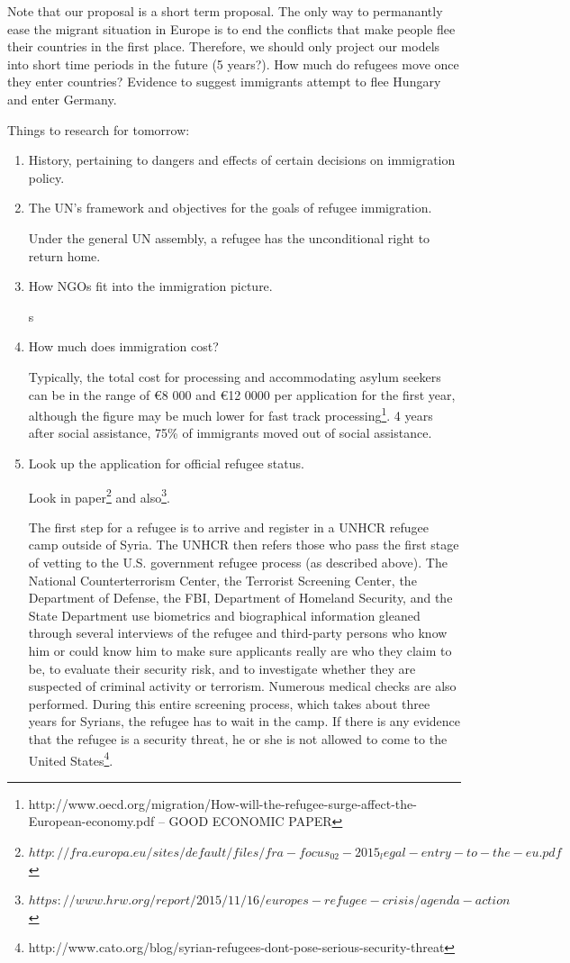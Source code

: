 \documentclass{article}
\begin{document}
Note that our proposal is a short term proposal. The only way to permanantly ease the migrant situation in Europe is to end the conflicts that make people flee their countries in the first place. Therefore, we should only project our models into short time periods in the future (5 years?). How much do refugees move once they enter countries? Evidence to suggest immigrants attempt to flee Hungary and enter Germany.

Things to research for tomorrow:
\begin{enumerate}
    \item History, pertaining to dangers and effects of certain decisions on immigration policy.
    \item The UN's framework and objectives for the goals of refugee immigration.

    Under the general UN assembly, a refugee has the unconditional right to return home.

    \item How NGOs fit into the immigration picture.

    s

    \item How much does immigration cost?

    Typically, the total cost for processing and accommodating asylum seekers can be in the range of €8 000 and €12 0000 per application for the first year, although the figure may be much lower for fast track processing\footnote{http://www.oecd.org/migration/How-will-the-refugee-surge-affect-the-European-economy.pdf -- GOOD ECONOMIC PAPER}. 4 years after social assistance, 75\% of immigrants moved out of social assistance.

    \item Look up the application for official refugee status.

    Look in paper\footnote{$http://fra.europa.eu/sites/default/files/fra-focus_02-2015_legal-entry-to-the-eu.pdf$} and also\footnote{$https://www.hrw.org/report/2015/11/16/europes-refugee-crisis/agenda-action$}.

    The first step for a refugee is to arrive and register in a UNHCR refugee camp outside of Syria. The UNHCR then refers those who pass the first stage of vetting to the U.S. government refugee process (as described above). The National Counterterrorism Center, the Terrorist Screening Center, the Department of Defense, the FBI, Department of Homeland Security, and the State Department use biometrics and biographical information gleaned through several interviews of the refugee and third-party persons who know him or could know him to make sure applicants really are who they claim to be, to evaluate their security risk, and to investigate whether they are suspected of criminal activity or terrorism.  Numerous medical checks are also performed.  During this entire screening process, which takes about three years for Syrians, the refugee has to wait in the camp. If there is any evidence that the refugee is a security threat, he or she is not allowed to come to the United States\footnote{http://www.cato.org/blog/syrian-refugees-dont-pose-serious-security-threat}.


\end{enumerate}
\end{document}
